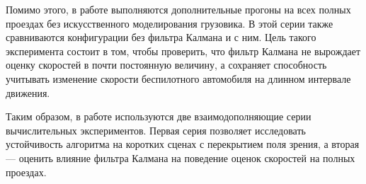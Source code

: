Помимо этого, в работе выполняются дополнительные прогоны на всех полных проездах без искусственного моделирования грузовика. В этой серии также сравниваются конфигурации без фильтра Калмана и с ним. Цель такого эксперимента состоит в том, чтобы проверить, что фильтр Калмана не вырождает оценку скоростей в почти постоянную величину, а сохраняет способность учитывать изменение скорости беспилотного автомобиля на длинном интервале движения.

Таким образом, в работе используются две взаимодополняющие серии вычислительных экспериментов. Первая серия позволяет исследовать устойчивость алгоритма на коротких сценах с перекрытием поля зрения, а вторая --- оценить влияние фильтра Калмана на поведение оценок скоростей на полных проездах.
